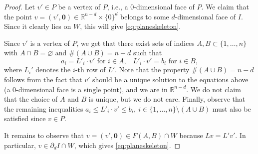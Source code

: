 \documentclass[11pt,reqno]{amsart}
\renewcommand{\d}{{\partial}}
\theoremstyle{definition}
\theoremstyle{remark}
\numberwithin{equation}{section}
\newcommand{\R}{\mathbb{R}}
\theoremstyle{theorem}
\theoremstyle{definition}
\theoremstyle{remark}
\numberwithin{equation}{section}
\begin{document}
\begin{proof}
		Let $v'\in P$ be a vertex of $P$, i.e., a $0$-dimensional face of $P$. We claim that the point $v=(v',\textbf{0})\in\R^{n-d}\times\{0\}^d$ belongs to some $d$-dimensional face of $I$. Since it clearly lies on $W$, this will give \eqref{eq:planeskeleton}.
		
		Since $v'$ is a vertex of $P$, we get that there exist sets of indices $A,B\subset\{1,\dots,n\}$ with $A\cap B=\varnothing$ and $\#(A\cup B)=n-d$ such that
		\begin{equation*}
		a_i=L'_i\cdot v' \text{ for $i\in A$,}\quad L'_i\cdot v' = b_i \text{ for $i\in B$},
		\end{equation*}
		where $L_i'$ denotes the $i$-th row of $L'$. Note that the property $\#(A\cup B)=n-d$ follows from the fact that $v'$ should be a unique solution to the equations above (a $0$-dimensional face is a single point), and we are in $\R^{n-d}$. We do not claim that the choice of $A$ and $B$ is unique, but we do not care. Finally, observe that the remaining inequalities $a_i\le L'_i\cdot v' \le b_i,\ i\in \{1,\dots,n\}\setminus(A\cup B)$ must also be satisfied since $v\in P$.
		
		It remains to observe that $v=(v',\textbf{0})\in F(A,B)\cap W$ because $Lv = L'v'$. In particular, $v\in \d_d I\cap W$, which gives \eqref{eq:planeskeleton}.
	\end{proof}
\end{document}
